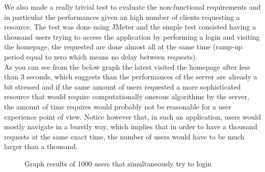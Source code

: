 We also made a really trivial test to evaluate the non-functional requirements and in particular the performances given an high number of clients requesting a resource. The test was done using JMeter and the simple test consisted having a thousand users trying to access the application by performing a login and visiting the homepage, the requested are done almost all at the same time (ramp-up period equal to zero which means no delay between requests).
\\As you can see from the below graph the latest visited the homepage after less than 3 seconds, which suggests than the performances of the server are already a bit stressed and if the same amount of users requested a more sophisticated resource that would require computationally onerous algorithms by the server, the amount of time requires would probably not be reasonable for a user experience point of view. Notice however that, in such an application, users would mostly navigate in a burstly way, which implies that in order to have a thousand requests at the same exact time, the number of users would have to be much larger than a thousand.

\begin{figure} 
\begin{center}

\caption{Graph results of 1000 users that simultaneously try to login} 
\label{fig:jmetertest} 


\end{center}
\end{figure} 



